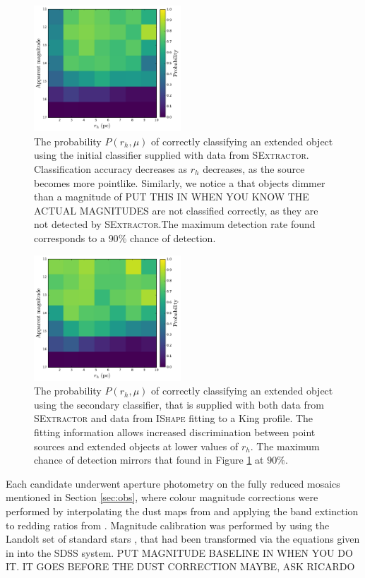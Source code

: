 \documentclass[useAMS,usenatbib]{mn2e}
\begin{document}
\begin{figure}
	\includegraphics[width=0.49\textwidth]{images/classifier_1.pdf}
	\caption{The probability $P(r_h, \mu)$ of correctly classifying an extended object using the initial classifier supplied with data from \textsc{SExtractor}. Classification accuracy decreases as $r_h$ decreases, as the source becomes more pointlike. Similarly, we notice a that objects dimmer than a magnitude of {\color{red} PUT THIS IN WHEN YOU KNOW THE ACTUAL MAGNITUDES} are not classified correctly, as they are not detected by \textsc{SExtractor}.The maximum detection rate found corresponds to a $90\%$ chance of detection.}
	\label{fig:comp1}
\end{figure}
\begin{figure}
	\includegraphics[width=0.49\textwidth]{images/classifier_2.pdf}
	\caption{The probability $P(r_h, \mu)$ of correctly classifying an extended object using the secondary classifier, that is supplied with both data from \textsc{SExtractor} and data from \textsc{IShape} fitting to a King profile. The fitting information allows increased discrimination between point sources and extended objects at lower values of $r_h$. The maximum chance of detection mirrors that found in Figure \ref{fig:comp1} at $90\%$.}
	\label{fig:comp2}
\end{figure}



Each candidate underwent aperture photometry on the fully reduced mosaics mentioned in Section \ref{sec:obs}, where colour magnitude corrections were performed by interpolating the dust maps from \citet{Schlegel1998} and applying the band extinction to redding ratios from \citet{Schlafly2011}. Magnitude calibration was performed by using the Landolt set of standard stars \citep{Landolt1992}, that had been transformed via the equations given in \citet{Fukugita1996} into the SDSS system. {\color{blue} PUT MAGNITUDE BASELINE IN WHEN YOU DO IT. IT GOES BEFORE THE DUST CORRECTION MAYBE, ASK RICARDO} 
\end{document}
